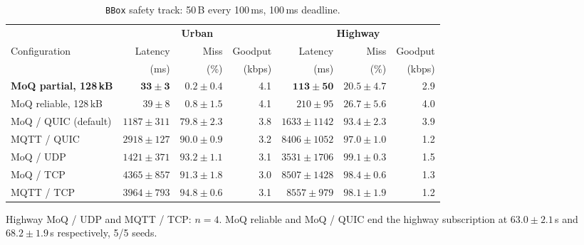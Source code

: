 \begin{table}[htbp]
  \centering
  \caption{\texttt{BBox} safety track: 50\,B every 100\,ms, 100\,ms deadline.}
  \label{tab:rq2-bbox}
  \begin{tabular}{@{}lrrrrrr@{}}
    \toprule
    & \multicolumn{3}{c}{\textbf{Urban}} & \multicolumn{3}{c}{\textbf{Highway}} \\
    \cmidrule(lr){2-4}\cmidrule(lr){5-7}
    Configuration
      & Latency & Miss & Goodput & Latency & Miss & Goodput \\
      & (ms)    & (\%) & (kbps)  & (ms)    & (\%) & (kbps)  \\
    \midrule
    \textbf{MoQ partial, 128\,kB}
      & $\mathbf{33 \pm 3}$   & $\mathbf{0.2 \pm 0.4}$ & 4.1
      & $\mathbf{113 \pm 50}$ & $20.5 \pm 4.7$         & 2.9 \\
    MoQ reliable, 128\,kB
      & $39 \pm 8$    & $0.8 \pm 1.5$  & 4.1
      & $210 \pm 95$  & $26.7 \pm 5.6$ & 4.0 \\
    MoQ / QUIC (default)
      & $1187 \pm 311$  & $79.8 \pm 2.3$ & 3.8
      & $1633 \pm 1142$ & $93.4 \pm 2.3$ & 3.9 \\
    MQTT / QUIC
      & $2918 \pm 127$  & $90.0 \pm 0.9$ & 3.2
      & $8406 \pm 1052$ & $97.0 \pm 1.0$ & 1.2 \\
    MoQ / UDP
      & $1421 \pm 371$  & $93.2 \pm 1.1$ & 3.1
      & $3531 \pm 1706$ & $99.1 \pm 0.3$ & 1.5 \\
    MoQ / TCP
      & $4365 \pm 857$  & $91.3 \pm 1.8$ & 3.0
      & $8507 \pm 1428$ & $98.4 \pm 0.6$ & 1.3 \\
    MQTT / TCP
      & $3964 \pm 793$ & $94.8 \pm 0.6$ & 3.1
      & $8557 \pm 979$ & $98.1 \pm 1.9$ & 1.2 \\
    \bottomrule
  \end{tabular}

  \smallskip
  \footnotesize
  Highway MoQ / UDP and MQTT / TCP: $n = 4$.
  MoQ reliable and MoQ / QUIC end the highway subscription at
  $63.0 \pm 2.1$\,s and $68.2 \pm 1.9$\,s respectively, 5/5 seeds.
\end{table}


